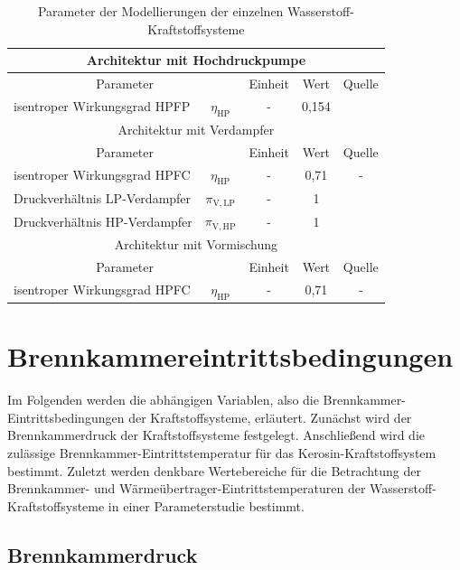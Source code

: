 \begin{table}[ht]
	\centering
	\caption{Parameter der Modellierungen der einzelnen Wasserstoff-Kraftstoffsysteme}
	\begin{tabular} {|l|c|c|c|c|} \hline%
		\multicolumn{5}{|c|}{Architektur mit Hochdruckpumpe}\\ \hline
		\multicolumn{2}{|c|}{Parameter} & Einheit & Wert & Quelle\\ \hline\hline%
		isentroper Wirkungsgrad HPFP & $\eta_\mathrm{HP}$ & - & 0,154 & \cite{Brewer.1991} \\ \hline
		\multicolumn{5}{|c|}{Architektur mit Verdampfer}\\ \hline
		\multicolumn{2}{|c|}{Parameter} & Einheit & Wert & Quelle\\ \hline\hline%
		isentroper Wirkungsgrad HPFC & $\eta_\mathrm{HP}$ & - & 0,71 & - \\ \hline
		Druckverhältnis LP-Verdampfer & $\pi_\mathrm{V,LP}$ & - & 1 & \cite{Sciatti.2025} \\ \hline
		Druckverhältnis HP-Verdampfer & $\pi_\mathrm{V,HP}$ & - & 1 & \cite{Sciatti.2025} \\ \hline\hline
		\multicolumn{5}{|c|}{Architektur mit Vormischung}\\ \hline
		\multicolumn{2}{|c|}{Parameter} & Einheit & Wert & Quelle\\ \hline\hline%
		isentroper Wirkungsgrad HPFC & $\eta_\mathrm{HP}$ & - & 0,71 & - \\ \hline
	\end{tabular}	
	\label{Tab:h2_param2}%
\end{table}
\FloatBarrier 

\section{Brennkammereintrittsbedingungen}

Im Folgenden werden die abhängigen Variablen, also die Brennkammer-Eintrittsbedingungen der Kraftstoffsysteme, erläutert. Zunächst wird der Brennkammerdruck der Kraftstoffsysteme festgelegt. Anschließend wird die zulässige Brennkammer-Eintrittstemperatur für das Kerosin-Kraftstoffsystem bestimmt. Zuletzt werden denkbare Wertebereiche für die Betrachtung der Brennkammer- und Wärmeübertrager-Eintrittstemperaturen der Wasserstoff-Kraftstoffsysteme in einer Parameterstudie bestimmt.

\subsection{Brennkammerdruck}

